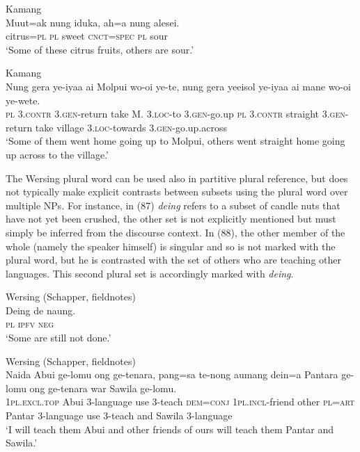\ea%
\label{ex:84}
Kamang \citep[40]{Stokhof1982}\\
\gll  Muut=ak nung iduka, ah=a nung alesei. \\
   citrus=\textsc{pl} \textsc{pl} sweet \textsc{cnct=spec} \textsc{pl} sour  \\
\glt `Some of these citrus fruits, others are sour.'
\z







\ea%
\label{ex:85}
Kamang \citep[57]{Stokhof1978}\\
\gll  Nung gera ye-iyaa ai Molpui wo-oi ye-te,  nung gera yeeisol ye-iyaa ai  mane wo-oi ye-wete. \\
    \textsc{pl 3.contr 3.gen}-return take M. 3.\textsc{loc}-to \textsc{3.gen}-go.up  \textsc{pl} \textsc{3.contr} straight \textsc{3.gen}-return take  village 3.\textsc{loc}-towards \textsc{3.gen}-go.up.across \\
\glt `Some of them went home going up to Molpui, others went straight home going up across to the village.'
\z




The Wersing plural word can be used also in partitive plural reference, but does not typically make explicit contrasts between subsets using the plural word over multiple NPs. For instance, in (87) \textit{deing} refers to a subset of candle nuts that have not yet been crushed, the other set is not explicitly mentioned but must simply be inferred from the discourse context. In (88), the other member of the whole (namely the speaker himself) is singular and so is not marked with the plural word, but he is contrasted with the set of others who are teaching other languages. This second plural set is accordingly marked with \textit{deing}.


\ea%
\label{ex:86}
Wersing (Schapper, fieldnotes)\\
\gll Deing de naung. \\
 \textsc{pl} \textsc{ipfv} \textsc{neg}   \\
\glt `Some are still not done.'
\z







\ea%
\label{ex:87}
Wersing (Schapper, fieldnotes)\\
\gll  Naida Abui ge-lomu ong ge-tenara,  pang=sa te-nong aumang dein=a  Pantara ge-lomu ong ge-tenara war Sawila ge-lomu. \\
  \textsc{1pl.excl.top} Abui 3-language use 3-teach  \textsc{dem=conj} \textsc{1pl.incl}-friend other \textsc{pl=art}   Pantar 3-language use 3-teach and Sawila 3-language  \\
\glt `I will teach them Abui and other friends of ours  will teach them Pantar and Sawila.'
\z


